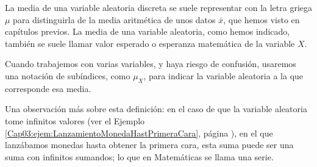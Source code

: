     \begin{center}
    \end{center}
La media de una variable aleatoria discreta se suele representar con la letra griega $\mu$ para distinguirla de la media aritmética de unos datos $\bar x$, que hemos visto en capítulos previos. La media de una variable aleatoria, como hemos indicado, también se suele llamar valor esperado o esperanza matemática de la variable $X$.

Cuando trabajemos con varias variables, y haya riesgo de confusión, usaremos una notación de subíndices, como $\mu_X$, para indicar la variable aleatoria a la que corresponde esa media.

Una observación más sobre esta definición: en el caso de que la variable aleatoria tome infinitos valores (ver el Ejemplo \ref{Cap03:ejem:LanzamientoMonedaHastPrimeraCara}, página \pageref{Cap03:ejem:LanzamientoMonedaHastPrimeraCara}), en el que lanzábamos monedas hasta obtener la primera cara, esta suma puede ser una suma con infinitos sumandos; lo que en Matemáticas se llama una {\sf serie}.

